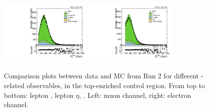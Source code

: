 \begin{figure}[htbp]
  \includegraphics[width=0.4\textwidth]{fig/controlPlots/CR_b1_mu_allP_allC_allD_Run2_met_pt.pdf}
  \includegraphics[width=0.4\textwidth]{fig/controlPlots/CR_b1_e_allP_allC_allD_Run2_met_pt.pdf}\\
  \caption{
    Comparison plots between data and MC from Run 2 for different \Wlep-related observables, in the top-enriched control region.
    From top to bottom: lepton \pt, lepton $\eta$, \Etmiss.
    Left: muon channel, right: electron channel.
  }
  \label{fig:CR_controlPlotsRun2_1}
\end{figure}

